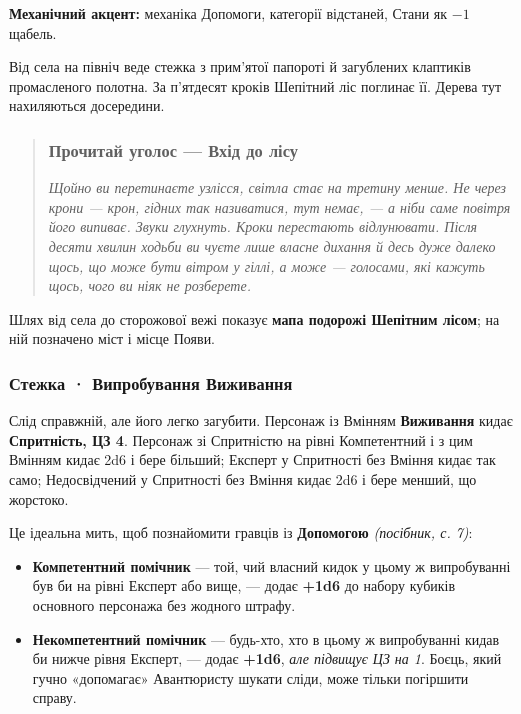 \documentclass[10pt,a4paper]{article}
\newcommand{\tightlist}{\setlength{\itemsep}{0pt}\setlength{\parskip}{0pt}}
\begin{document}
\textbf{Механічний акцент:} механіка Допомоги, категорії відстаней, Стани як $-1$ щабель.

Від села на північ веде стежка з прим’ятої папороті й загублених клаптиків промасленого полотна. За п’ятдесят кроків Шепітний ліс поглинає її. Дерева тут нахиляються досередини.

\begin{quote}
\subsubsection{Прочитай уголос --- Вхід до лісу}\label{ux43fux440ux43eux447ux438ux442ux430ux439-ux443ux433ux43eux43bux43eux441-ux443-ux43bux456ux441ux456}

\emph{Щойно ви перетинаєте узлісся, світла стає на третину менше. Не через крони --- крон, гідних так називатися, тут немає, --- а ніби саме повітря його випиває. Звуки глухнуть. Кроки перестають відлунювати. Після десяти хвилин ходьби ви чуєте лише власне дихання й десь дуже далеко щось, що може бути вітром у гіллі, а може --- голосами, які кажуть щось, чого ви ніяк не розберете.}
\end{quote}

Шлях від села до сторожової вежі показує \textbf{мапа подорожі Шепітним лісом}; на ній позначено міст і місце Появи.

\subsubsection{Стежка · Випробування Виживання}\label{ux441ux442ux435ux436ux43aux430-ux432ux438ux43fux440ux43eux431ux443ux432ux430ux43dux43dux44f-ux432ux438ux436ux438ux432ux430ux43dux43dux44f}

Слід справжній, але його легко загубити. Персонаж із Вмінням \textbf{Виживання} кидає \textbf{Спритність, ЦЗ 4}. Персонаж зі Спритністю на рівні Компетентний і з цим Вмінням кидає 2d6 і бере більший; Експерт у Спритності без Вміння кидає так само; Недосвідчений у Спритності без Вміння кидає 2d6 і бере менший, що жорстоко.

Це ідеальна мить, щоб познайомити гравців із \textbf{Допомогою} \emph{(посібник, с. 7)}:

\begin{itemize}
\tightlist
\item
  \textbf{Компетентний помічник} --- той, чий власний кидок у цьому ж випробуванні був би на рівні Експерт або вище, --- додає \textbf{+1d6} до набору кубиків основного персонажа без жодного штрафу.
\item
  \textbf{Некомпетентний помічник} --- будь-хто, хто в цьому ж випробуванні кидав би нижче рівня Експерт, --- додає \textbf{+1d6}, \emph{але підвищує ЦЗ на 1}. Боєць, який гучно «допомагає» Авантюристу шукати сліди, може тільки погіршити справу.
\end{itemize}
\end{document}
